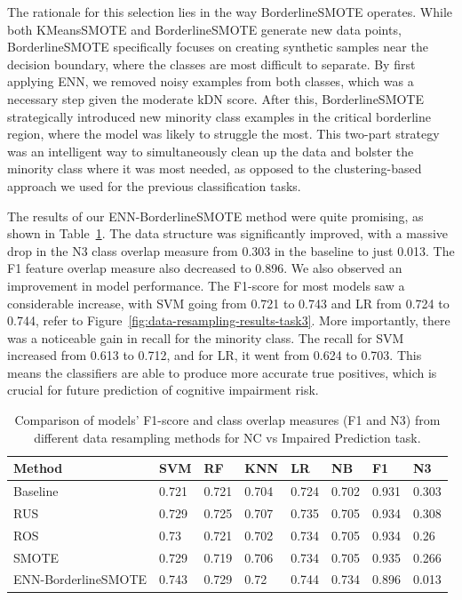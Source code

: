 The rationale for this selection lies in the way BorderlineSMOTE operates. While both KMeansSMOTE and BorderlineSMOTE generate new data points, BorderlineSMOTE specifically focuses on creating synthetic samples near the decision boundary, where the classes are most difficult to separate. By first applying ENN, we removed noisy examples from both classes, which was a necessary step given the moderate kDN score. After this, BorderlineSMOTE strategically introduced new minority class examples in the critical borderline region, where the model was likely to struggle the most. This two-part strategy was an intelligent way to simultaneously clean up the data and bolster the minority class where it was most needed, as opposed to the clustering-based approach we used for the previous classification tasks.

The results of our ENN-BorderlineSMOTE method were quite promising, as shown in Table~\ref{table:data-resampling-results-task3}. The data structure was significantly improved, with a massive drop in the N3 class overlap measure from 0.303 in the baseline to just 0.013. The F1 feature overlap measure also decreased to 0.896. We also observed an improvement in model performance. The F1-score for most models saw a considerable increase, with SVM going from 0.721 to 0.743 and LR from 0.724 to 0.744, refer to Figure~\ref{fig:data-resampling-results-task3}. More importantly, there was a noticeable gain in recall for the minority class. The recall for SVM increased from 0.613 to 0.712, and for LR, it went from 0.624 to 0.703. This means the classifiers are able to produce more accurate true positives, which is crucial for future prediction of cognitive impairment risk.

\begin{table}[!ht]
    \centering
    \caption{Comparison of models' F1-score and class overlap measures (F1 and N3) from different data resampling methods for NC vs Impaired Prediction task.}
    \begin{tabular}{|l|l|l|l|l|l|l|l|}
    \hline
        Method & SVM & RF & KNN & LR & NB & F1 & N3 \\ \hline
        Baseline & 0.721 & 0.721 & 0.704 & 0.724 & 0.702 & 0.931 & 0.303 \\ \hline
        RUS & 0.729 & 0.725 & 0.707 & 0.735 & 0.705 & 0.934 & 0.308 \\ \hline
        ROS & 0.73 & 0.721 & 0.702 & 0.734 & 0.705 & 0.934 & 0.26 \\ \hline
        SMOTE & 0.729 & 0.719 & 0.706 & 0.734 & 0.705 & 0.935 & 0.266 \\ \hline
        ENN-BorderlineSMOTE & 0.743 & 0.729 & 0.72 & 0.744 & 0.734 & 0.896 & 0.013 \\ \hline
    \end{tabular}
    \label{table:data-resampling-results-task3}
\end{table}

